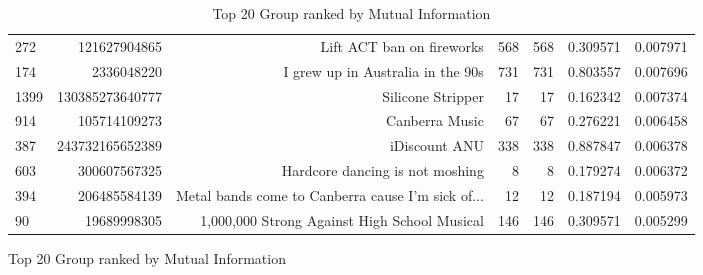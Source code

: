 \documentclass[letterpaper]{article}
\begin{document}
\begin{figure}
\begin{table}
\begin{tabular}{| >{\small}l | >{\small}r | >{\small}r | >{\small}r | >{\small}r | >{\small}r |>{\small}r |}
272  &     121627904865 &                          Lift ACT ban on fireworks &   568 &      568 &             0.309571 &            0.007971 \\
174  &       2336048220 &                  I grew up in Australia in the 90s &   731 &      731 &             0.803557 &            0.007696 \\
1399 &  130385273640777 &                                  Silicone Stripper &    17 &       17 &             0.162342 &            0.007374 \\
914  &     105714109273 &                                     Canberra Music &    67 &       67 &             0.276221 &            0.006458 \\
387  &  243732165652389 &                                      iDiscount ANU &   338 &      338 &             0.887847 &            0.006378 \\
603  &     300607567325 &                    Hardcore dancing is not moshing &     8 &        8 &             0.179274 &            0.006372 \\
394  &     206485584139 &  Metal bands come to Canberra cause I'm sick of... &    12 &       12 &             0.187194 &            0.005973 \\
90   &      19689998305 &       1,000,000 Strong Against High School Musical &   146 &      146 &             0.309571 &            0.005299 \\
\hline
\end{tabular}
\caption{Top 20 Group ranked by Mutual Information}
\label {Top 20 Group ranked by Mutual Information}
\end{table}



\end{figure}
\end{document}
